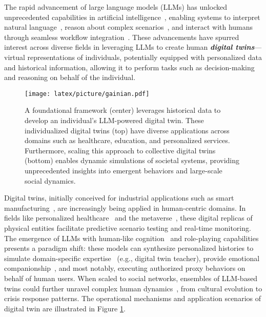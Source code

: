 The rapid advancement of large language models (LLMs) has unlocked unprecedented capabilities in artificial intelligence~\cite{ding2023unraveling}, enabling systems to interpret natural language~\cite{lu2024llms}, reason about complex scenarios~\cite{huang2024planning}, and interact with humans through seamless workflow integration~\cite{yang2024llm}.  These advancements have spurred interest across diverse fields in leveraging LLMs to create human \textbf{\textit{digital twins}}—virtual representations of individuals, potentially equipped with personalized data and historical information, allowing it to perform tasks such as decision-making and reasoning on behalf of the individual.



\begin{figure}[t]
    \centering
    \texttt{[image: latex/picture/gainian.pdf]}
    \caption{A foundational framework (center) leverages historical data to develop an individual's LLM-powered digital twin.  These individualized digital twins (top) have diverse applications across domains such as healthcare, education, and personalized services.  Furthermore, scaling this approach to collective digital twins (bottom) enables dynamic simulations of societal systems, providing unprecedented insights into emergent behaviors and large-scale social dynamics.}
    \label{fig:application}
\end{figure}







Digital twins, initially conceived for industrial applications such as smart manufacturing~\cite{kreuzer2024artificial}, are increasingly being applied in human-centric domains. 
In fields like personalized healthcare~\cite{wang2024twin} and the metaverse~\cite{lv2022building, aloqaily2022integrating, far2022applying}, these digital replicas of physical entities facilitate predictive scenario testing and real-time monitoring.
The emergence of LLMs with human-like cognition~\cite{gonzalez2024building} and role-playing capabilities~\cite{chen2024from} presents a paradigm shift: these models can synthesize personalized histories to simulate domain-specific expertise~\cite{li2024personal,blasek2023large} (e.g., digital twin teacher), provide emotional companionship~\cite{tu2023characterchat},
and most notably, executing authorized proxy behaviors on behalf of human users.
When scaled to social networks, ensembles of LLM-based twins could further unravel complex human dynamics~\cite{rossetti2024ysocialllmpoweredsocial}, from cultural evolution to crisis response patterns. 
The operational mechanisms and application scenarios of digital twin are illustrated in Figure \ref{fig:application}.


